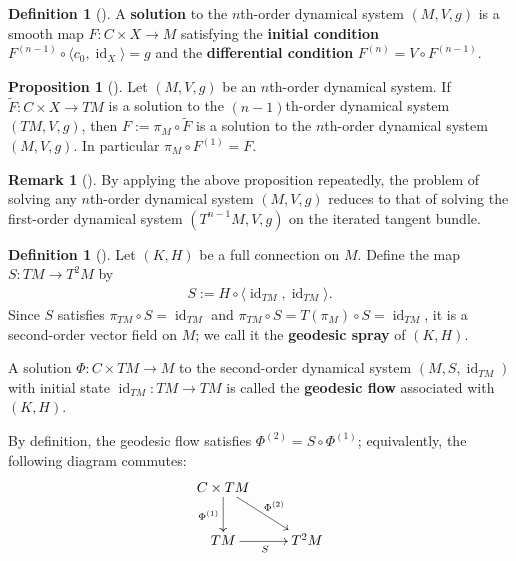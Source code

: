 \documentclass{amsart}
\DeclareMathOperator{\id}{id}
\theoremstyle{definition}
\newtheorem{defn}[thm]{Definition}
\newtheorem{rem}[thm]{Remark}
\newtheorem{prop}[thm]{Proposition}
\begin{document}
\begin{defn}[{\cite[Definition~3.12]{CCL}}]\label{def:nth-solution}
  A \textbf{solution} to the $n$th-order dynamical system $(M, V, g)$
  is a smooth map $F \colon C \times X \to M$ satisfying the
  \textbf{initial condition}
  $F^{(n-1)} \circ \langle c_0, \id_X \rangle = g$ and the
  \textbf{differential condition} $F^{(n)} = V \circ F^{(n-1)}$.
\end{defn}

\begin{prop}[{\cite[Proposition~3.13]{CCL}}]\label{prop:higher-dynamical-system}
  Let $(M, V, g)$ be an $n$th-order dynamical system.
  If $\tilde{F} \colon C \times X \to TM$ is a solution to the
  $(n-1)$th-order dynamical system $(TM, V, g)$,
  then $F := \pi_M \circ \tilde{F}$ is a solution to the
  $n$th-order dynamical system $(M, V, g)$. In particular
  $\pi_M \circ F^{(1)} = F$.
\end{prop}

\begin{rem}[{\cite[Corollary~3.14]{CCL}}]\label{rem:reduction-to-first-order}
  By applying the above proposition repeatedly, the problem of solving any
  $n$th-order dynamical system $(M, V, g)$ reduces to that of solving
  the first-order dynamical system $(T^{n-1}M, V, g)$ on the iterated tangent bundle.
\end{rem}

\begin{defn}[{\cite[Section~3.5]{CCL}}]\label{def:geodesic-spray}
  Let $(K, H)$ be a full connection on $M$.
  Define the map $S \colon TM \to T^2M$ by
  \begin{align*}
      S := H \circ \langle \id_{TM}, \id_{TM} \rangle.
  \end{align*}
  Since $S$ satisfies $\pi_{TM} \circ S = \id_{TM}$ and $\pi_{TM} \circ S = T(\pi_M) \circ S = \id_{TM}$,
  it is a second-order vector field on $M$;
  we call it the \textbf{geodesic spray} of $(K, H)$.

  A solution $\Phi \colon C \times TM \to M$ to the second-order dynamical system
  $(M, S, \id_{TM})$ with initial state $\id_{TM} \colon TM \to TM$
  is called the \textbf{geodesic flow} associated with $(K, H)$.
\end{defn}

By definition, the geodesic flow satisfies $\Phi^{(2)} = S \circ \Phi^{(1)}$;
equivalently, the following diagram commutes:
\[
  \xymatrix{
    C \times TM \ar[d]_{\Phi^{(1)}} \ar[dr]^{\Phi^{(2)}} & \\
    TM \ar[r]_{S} & T^2M
  }
\]
\end{document}
